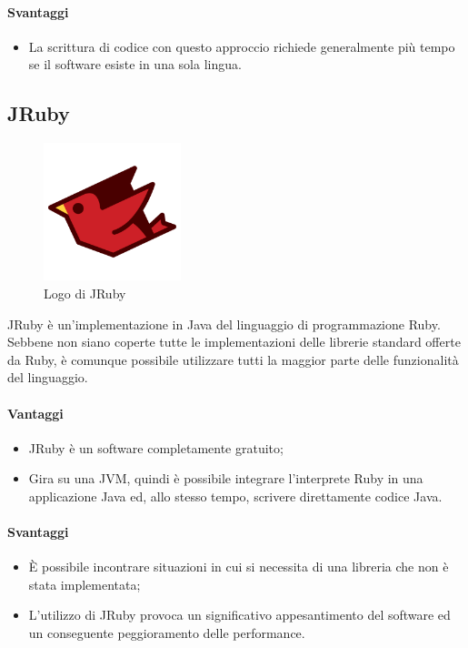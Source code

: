 \paragraph{Svantaggi}
	\begin{itemize}
		\item La scrittura di codice con questo approccio richiede generalmente più tempo se il software esiste in una sola lingua.
	\end{itemize}
\subsection{JRuby}
	\begin{figure}[H]
		\begin{center}
			\includegraphics[width=4cm]{Pics/jruby-logo.png}
			\caption{Logo di JRuby}
			\label{fig:JRubyLogo}
		\end{center}
	\end{figure}
	JRuby è un'implementazione in Java del linguaggio di programmazione Ruby. \\
	Sebbene non siano coperte tutte le implementazioni delle librerie standard offerte da Ruby, è comunque possibile utilizzare tutti la maggior parte delle funzionalità del  linguaggio.
\paragraph{Vantaggi}
\begin{itemize}
	\item JRuby è un software completamente gratuito;
	\item Gira su una JVM, quindi è possibile integrare l'interprete Ruby in una applicazione Java ed, allo stesso tempo, scrivere direttamente codice Java.
\end{itemize}
\paragraph{Svantaggi}
	\begin{itemize}
		\item È possibile incontrare situazioni in cui si necessita di una libreria che non è stata implementata;
		\item L'utilizzo di JRuby provoca un significativo appesantimento del software ed un conseguente peggioramento delle performance. 
	\end{itemize}
